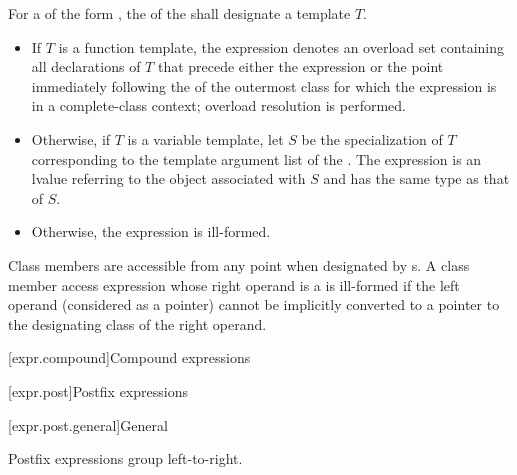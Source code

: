 \pnum
For a  of
the form ,
the  of
the 
shall designate a template $T$.
\begin{itemize}
\item
If $T$ is a function template,
the expression denotes an overload set containing all declarations of $T$
that precede either the expression or
the point immediately following the  of
the outermost class for which the expression is in a complete-class context;
overload resolution is performed.
\item
Otherwise, if $T$ is a variable template,
let $S$ be the specialization of $T$ corresponding to
the template argument list of the .
The expression is an lvalue referring to
the object associated with $S$ and has the same type as that of $S$.
\item
Otherwise, the expression is ill-formed.
\end{itemize}
\begin{note}
Class members are accessible from any point
when designated by s.
A class member access expression
whose right operand is a  is ill-formed
if the left operand (considered as a pointer) cannot be implicitly converted
to a pointer to the designating class of the right operand.
\end{note}

[expr.compound]{Compound expressions}

[expr.post]{Postfix expressions}%

[expr.post.general]{General}%

\pnum
Postfix expressions group left-to-right.

